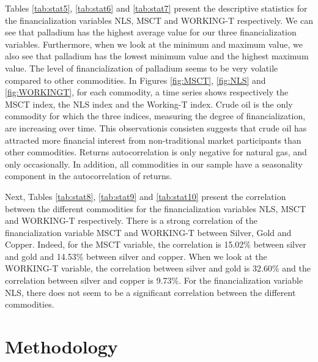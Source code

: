 \documentclass[12pt]{article}
\begin{document}
Tables \ref{tab:stat5}, \ref{tab:stat6} and \ref{tab:stat7} present the descriptive statistics for the financialization variables NLS, MSCT and WORKING-T respectively. We can see that palladium has the highest average value for our three financialization variables. Furthermore, when we look at the minimum and maximum value, we also see that palladium has the lowest minimum value and the highest maximum value. The level of financialization of palladium seems to be very volatile compared to other commodities. In Figures \ref{fig:MSCT}, \ref{fig:NLS} and \ref{fig:WORKINGT}, for each commodity, a time series shows respectively the MSCT index, the NLS index and the Working-T index. Crude oil is the only commodity for which the three indices, measuring the degree of financialization, are increasing over time. This observationis consisten suggests that crude oil has attracted more financial interest from non-traditional market participants than other commodities. Returns autocorrelation is only negative for natural gas, and only occasionally. In addition, all commodities in our sample have a seasonality component in the autocorrelation of returns.
 
Next, Tables \ref{tab:stat8}, \ref{tab:stat9} and \ref{tab:stat10} present the correlation between the different commodities for the financialization variables NLS, MSCT and WORKING-T respectively. There is a strong correlation of the financialization variable MSCT and WORKING-T between Silver, Gold and Copper. Indeed, for the MSCT variable, the correlation is 15.02\% between silver and gold and 14.53\% between silver and copper. When we look at the WORKING-T variable, the correlation between silver and gold is 32.60\% and the correlation between silver and copper is 9.73\%. For the financialization variable NLS, there does not seem to be a significant correlation between the different commodities.

\section{Methodology}
\end{document}

